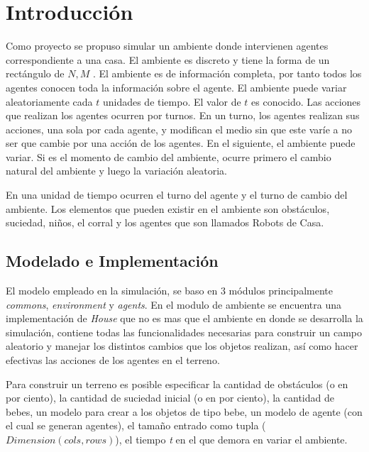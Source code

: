 \documentclass[a4paper,10pt,twocolumn]{article}
\begin{document}
\section{Introducción}
  Como proyecto se propuso simular un ambiente donde intervienen agentes correspondiente a una casa. El ambiente es discreto y tiene la forma de un rect\'angulo de $N, M$ . El ambiente es de informaci\'on completa, por tanto todos los agentes conocen toda la informaci\'on sobre el agente. El ambiente puede variar aleatoriamente cada $t$ unidades de tiempo. El valor de $t$ es conocido. Las acciones que realizan los agentes ocurren por turnos. En un turno, los agentes realizan sus acciones, una sola por cada agente, y modifican el medio sin que este var\'ie a no ser que cambie por una acci\'on de los agentes. En el siguiente, el ambiente puede variar. Si es el momento de cambio del ambiente, ocurre primero el cambio natural del ambiente y luego la variaci\'on aleatoria.
  
  En una unidad de tiempo ocurren el turno del agente y el turno de cambio del ambiente. Los elementos que pueden existir en el ambiente son obst\'aculos, suciedad, ni\~nos, el corral y los agentes que son llamados Robots de Casa.  

\subsection{Modelado e Implementaci\'on}

 El modelo empleado en la simulación, se baso en $3$ m\'odulos principalmente \textit{commons}, \textit{environment} y \textit{agents}. En el modulo de ambiente se encuentra una implementaci\'on de \textit{House} que no es mas que el ambiente en donde se desarrolla la simulaci\'on, contiene todas las funcionalidades necesarias para construir un campo aleatorio y manejar los distintos cambios que los objetos realizan, as\'i como hacer efectivas las acciones de los agentes en el terreno. 
 
 Para construir un terreno es posible especificar la cantidad de obst\'aculos (o en por ciento), la cantidad de suciedad inicial (o en por ciento), la cantidad de bebes, un modelo para crear a los objetos de tipo bebe, un modelo de agente (con el cual se generan agentes), el tama\~no entrado como tupla ($Dimension(cols, rows)$), el tiempo \textit{t} en el que demora en variar el ambiente.
 
\end{document}

